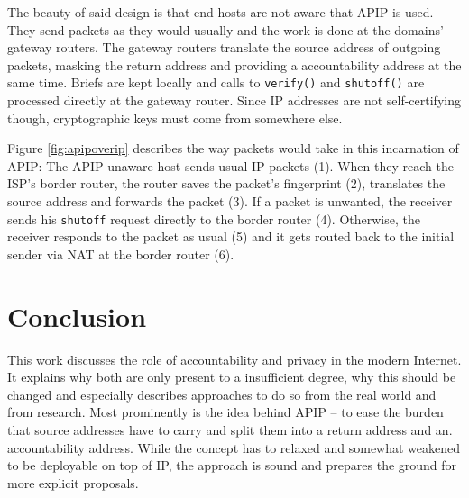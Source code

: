 \documentclass{acm_proc_article-sp}
\begin{document}
The beauty of said design is that end hosts are not aware that APIP is used. They send packets as they would usually and the work is done at the domains' gateway routers. The gateway routers translate the source address of outgoing packets, masking the return address and providing a accountability address at the same time. Briefs are kept locally and calls to \texttt{verify()} and \texttt{shutoff()} are processed directly at the gateway router. Since IP addresses are not self-certifying though, cryptographic keys must come from somewhere else.

Figure \ref{fig:apipoverip} describes the way packets would take in this incarnation of APIP: The APIP-unaware host sends usual IP packets (1). When they reach the ISP's border router, the router saves the packet's fingerprint (2), translates the source address and forwards the packet (3). If a packet is unwanted, the receiver sends his \texttt{shutoff} request directly to the border router (4). Otherwise, the receiver responds to the packet as usual (5) and it gets routed back to the initial sender via NAT at the border router (6).


\section{Conclusion}
\label{sec:con}
This work discusses the role of accountability and privacy in the modern Internet. It explains why both are only present to a insufficient degree, why this should be changed and especially describes approaches to do so from the real world and from research. Most prominently is the idea behind APIP -- to ease the burden that source addresses have to carry and split them into a return address and an. accountability address. While the concept has to relaxed and somewhat weakened to be deployable on top of IP, the approach is sound and prepares the ground for more explicit proposals.

%

%
%
\balancecolumns
\end{document}
